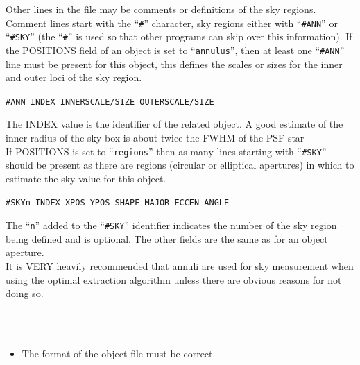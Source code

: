 \documentclass[twoside,11pt]{article}
\renewcommand{\_}{\texttt{\symbol{95}}}
\newcommand{\ft}[1]{``\texttt{#1}''}
\newcommand{\sstdiytopic}[2]{\item[{\hspace{-0.35em}#1\hspace{-0.35em}:}]
\mbox{} \\[1.3ex] #2}
\newcommand{\sstitemlist}[1]{
  \mbox{} \\
  \vspace{-3.5ex}
  \begin{itemize}
     #1
  \end{itemize}
}
\newcommand{\sstitem}{\item}
\newcommand{\sstdiytopic}[2]{\item[{#1}] #2 }
\newcommand{\sstitemlist}[1]{
      \begin{itemize}
         #1
      \end{itemize}
      \\
   }
\newcommand{\sstitem}{\item}
\begin{document}
{{{      Other lines in the file may be comments or definitions of the sky
      regions. Comment lines start with the \ft{\#} character, sky regions
      either with \ft{\#ANN} or \ft{\#SKY} (the \ft{\#} is used so that other
      programs can skip over this information). If the POSITIONS field
      of an object is set to \ft{annulus}, then at least one \ft{\#ANN} line must
      be present for this object, this defines the scales or sizes for
      the inner and outer loci of the sky region.
       \begin{description}
          \item  \hspace*{1cm} \texttt{\#ANN INDEX INNER\_SCALE/SIZE 
                           OUTER\_SCALE/SIZE}
       \end{description}
      The INDEX value is the identifier of the related object. A good
      estimate of the inner radius of the sky box is about twice the
      FWHM of the PSF star\\

      If POSITIONS is set to \ft{regions} then as many lines starting with
      \ft{\#SKY} should be present as there are regions (circular or
      elliptical apertures) in which to estimate the sky value for this
      object.
       \begin{description}
          \item  \hspace*{1cm} \texttt{\#SKYn INDEX XPOS YPOS SHAPE MAJOR ECCEN
                                        ANGLE}
       \end{description}
      The \ft{n} added to the \ft{\#SKY} identifier indicates the number of
      the sky region being defined and is optional. The other fields
      are the same as for an object aperture.\\

      It is VERY heavily recommended that annuli are used for sky measurement
      when using the optimal extraction algorithm unless there are obvious
      reasons for not doing so.          
        
    }
   }
   \sstdiytopic{
      Pitfalls
   }{
      \sstitemlist{
         \sstitem
         The format of the object file must be correct.
      }
   }
}
\newpage
\end{document}
